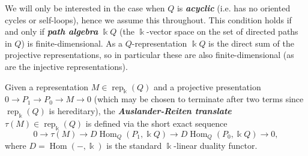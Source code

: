 \documentclass[12pt]{amsart}
\newcommand{\newword}[1]{\textbf{\emph{#1}}}
\newcommand{\kk}{\Bbbk}
\newcommand{\rep}{\operatorname{rep}}
\DeclareMathOperator{\Hom}{Hom}
\theoremstyle{remark}
\numberwithin{equation}{section}
\numberwithin{figure}{section}
\begin{document}
We will only be interested in the case when $Q$ is \newword{acyclic} (i.e. has no oriented cycles or self-loops), hence we assume this throughout. This condition holds if and only if \newword{path algebra} $\kk Q$ (the $\kk$-vector space on the set of directed paths in $Q$) is finite-dimensional. As a $Q$-representation $\kk Q$ is the direct sum of the projective representations, so in particular these are also finite-dimensional (as are the injective representations).




Given a representation $M\in\rep_\kk(Q)$ and a projective presentation $0\to P_1\to P_0\to M\to 0$ (which may be chosen to terminate after two terms since $\rep_\kk(Q)$ is hereditary), the \newword{Auslander-Reiten translate} $\tau(M)\in\rep_\kk(Q)$ is defined via the short exact sequence
\begin{equation}\label{eq:AR translation}
  0\longrightarrow \tau(M)\longrightarrow D\Hom_Q(P_1,\kk Q)\longrightarrow D\Hom_Q(P_0,\kk Q)\longrightarrow 0,
\end{equation}
where $D=\Hom(-,\kk)$ is the standard $\kk$-linear duality functor.
\end{document}
